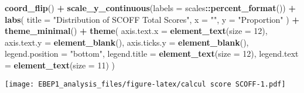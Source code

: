 \documentclass[
]{article}
\newenvironment{Shaded}{\begin{snugshade}}{\end{snugshade}}
\newcommand{\AttributeTok}[1]{\textcolor[rgb]{0.13,0.29,0.53}{#1}}
\newcommand{\DecValTok}[1]{\textcolor[rgb]{0.00,0.00,0.81}{#1}}
\newcommand{\FunctionTok}[1]{\textcolor[rgb]{0.13,0.29,0.53}{\textbf{#1}}}
\newcommand{\NormalTok}[1]{#1}
\newcommand{\SpecialCharTok}[1]{\textcolor[rgb]{0.81,0.36,0.00}{\textbf{#1}}}
\newcommand{\StringTok}[1]{\textcolor[rgb]{0.31,0.60,0.02}{#1}}
\begin{document}
\begin{Shaded}
\begin{Highlighting}[]
  \FunctionTok{coord\_flip}\NormalTok{() }\SpecialCharTok{+}
  \FunctionTok{scale\_y\_continuous}\NormalTok{(}\AttributeTok{labels =}\NormalTok{ scales}\SpecialCharTok{::}\FunctionTok{percent\_format}\NormalTok{()) }\SpecialCharTok{+}
  \FunctionTok{labs}\NormalTok{(}
    \AttributeTok{title =} \StringTok{"Distribution of SCOFF Total Scores"}\NormalTok{,}
    \AttributeTok{x =} \StringTok{""}\NormalTok{,}
    \AttributeTok{y =} \StringTok{"Proportion"}
\NormalTok{  ) }\SpecialCharTok{+}
  \FunctionTok{theme\_minimal}\NormalTok{() }\SpecialCharTok{+}
  \FunctionTok{theme}\NormalTok{(}
    \AttributeTok{axis.text.x =} \FunctionTok{element\_text}\NormalTok{(}\AttributeTok{size =} \DecValTok{12}\NormalTok{),}
    \AttributeTok{axis.text.y =} \FunctionTok{element\_blank}\NormalTok{(),}
    \AttributeTok{axis.ticks.y =} \FunctionTok{element\_blank}\NormalTok{(),}
    \AttributeTok{legend.position =} \StringTok{"bottom"}\NormalTok{,}
    \AttributeTok{legend.title =} \FunctionTok{element\_text}\NormalTok{(}\AttributeTok{size =} \DecValTok{12}\NormalTok{),}
    \AttributeTok{legend.text =} \FunctionTok{element\_text}\NormalTok{(}\AttributeTok{size =} \DecValTok{11}\NormalTok{)}
\NormalTok{  )}
\end{Highlighting}
\end{Shaded}

\texttt{[image: EBEP1\_analysis\_files/figure-latex/calcul score SCOFF-1.pdf]}
\end{document}
